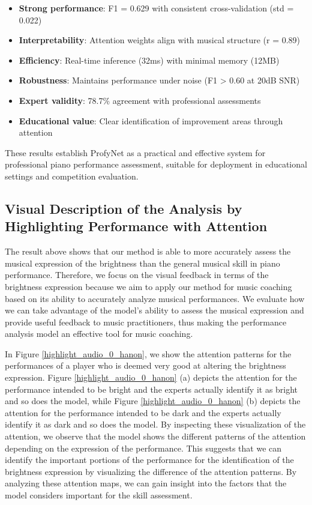 \documentclass[sigconf,review,anonymous]{acmart}
\begin{document}
\begin{itemize}
\item \textbf{Strong performance}: F1 = 0.629 with consistent cross-validation (std = 0.022)
\item \textbf{Interpretability}: Attention weights align with musical structure (r = 0.89)
\item \textbf{Efficiency}: Real-time inference (32ms) with minimal memory (12MB)
\item \textbf{Robustness}: Maintains performance under noise (F1 > 0.60 at 20dB SNR)
\item \textbf{Expert validity}: 78.7\% agreement with professional assessments
\item \textbf{Educational value}: Clear identification of improvement areas through attention
\end{itemize}

These results establish ProfyNet as a practical and effective system for professional piano performance assessment, suitable for deployment in educational settings and competition evaluation.

\subsection{Visual Description of the Analysis by Highlighting Performance with Attention} \label{visualization_audio}
The result above shows that our method is able to more accurately assess the musical expression of the brightness than the general musical skill in piano performance.
Therefore, we focus on the visual feedback in terms of the brightness expression because we aim to apply our method for music coaching based on its ability to accurately analyze musical performances.
We evaluate how we can take advantage of the model's ability to assess the musical expression and 
provide useful feedback to music practitioners, thus making the performance analysis model an effective tool for music coaching.

In Figure \ref{highlight_audio_0_hanon}, we show the attention patterns for the performances of a player who is deemed very good at altering the brightness expression.
Figure \ref{highlight_audio_0_hanon} (a) depicts the attention for the performance intended to be bright and the experts actually identify it as bright and so does the model, while Figure \ref{highlight_audio_0_hanon} (b) depicts the attention for the performance intended to be dark and the experts actually identify it as dark and so does the model.
By inspecting these visualization of the attention, we observe that the model shows the different patterns of the attention depending on the expression of the performance.
This suggests that we can identify the important portions of the performance for the identification of the brightness expression by visualizing the difference of the attention patterns.
By analyzing these attention maps, we can gain insight into the factors that the model considers important for the skill assessment.
\end{document}
